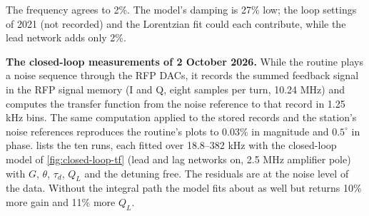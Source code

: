 The frequency agrees to 2\%. The model's damping is 27\% low; the loop settings of 2021 (not recorded) and the Lorentzian fit could each contribute, while the lead network adds only 2\%.

\textbf{The closed-loop measurements of 2 October 2026.} While the routine plays a noise sequence through the RFP DACs, it records the summed feedback signal in the RFP signal memory (I and Q, eight samples per turn, 10.24 MHz) and computes the transfer function from the noise reference to that record in 1.25 kHz bins. The same computation applied to the stored records and the station's noise references  reproduces the routine's plots to 0.03\% in magnitude and \(0.5^\circ\) in phase.  lists the ten runs, each fitted over 18.8--382 kHz with the closed-loop model of \cref{fig:closed-loop-tf} (lead and lag networks on, 2.5 MHz amplifier pole) with \(G\), \(\theta\), \(\tau_d\), \(Q_L\) and the detuning free. The residuals are at the noise level of the data. Without the integral path the model fits about as well but returns 10\% more gain and 11\% more \(Q_L\).

